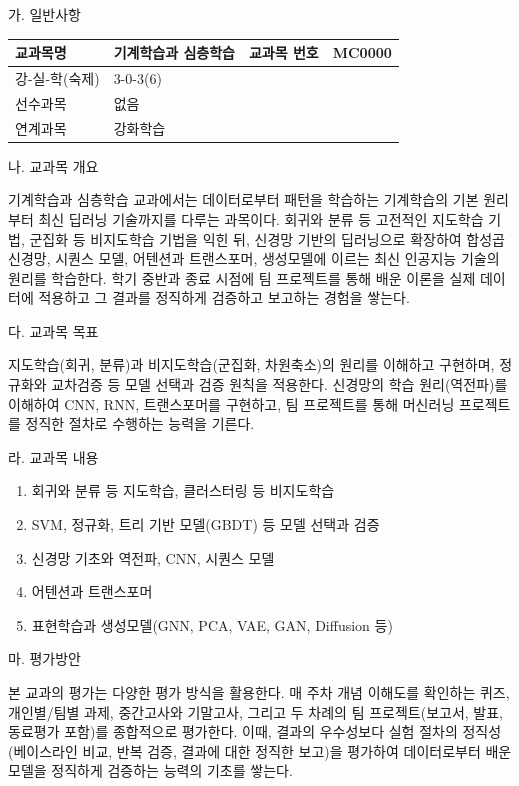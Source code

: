 \documentclass[11pt,a4paper]{article}
\newcommand{\gilban}[5]{%
  \noindent
  \begin{tabular}{|p{2.3cm}|p{4.3cm}|p{2.3cm}|p{4.3cm}|}
    \hline
    \centering 교과목명 & \centering\arraybackslash #1 & \centering 교과목 번호 & \centering\arraybackslash #2 \\
    \hline
    \centering 강-실-학(숙제) & \multicolumn{3}{l|}{\hspace{2mm}#3} \\
    \hline
    \centering 선수과목 & \multicolumn{3}{l|}{\hspace{2mm}#4} \\
    \hline
    \centering 연계과목 & \multicolumn{3}{l|}{\hspace{2mm}#5} \\
    \hline
  \end{tabular}
}
\newcounter{gwamok}
\newcommand{\gwamoktitle}[3]{%
  \stepcounter{gwamok}
  \vspace{6mm}
  \noindent{\bf \thegwamok. #1 (#2, #3)}\par
  \vspace{1mm}
  \noindent\hspace*{3mm}가. 일반사항\par
  \vspace{1mm}
}
\begin{document}
\gwamoktitle{기계학습과 심층학습}{선택}{3학점}
\gilban{기계학습과 심층학습}{MC0000}{3-0-3(6)}{없음}{강화학습}

\vspace{3mm}
\hspace*{3mm}나. 교과목 개요\\[1mm]
\hspace*{5mm}\begin{minipage}{0.92\textwidth}
기계학습과 심층학습 교과에서는 데이터로부터 패턴을 학습하는 기계학습의 기본 원리부터 최신
딥러닝 기술까지를 다루는 과목이다. 회귀와 분류 등 고전적인 지도학습
기법, 군집화 등 비지도학습 기법을 익힌 뒤, 신경망 기반의 딥러닝으로
확장하여 합성곱 신경망, 시퀀스 모델, 어텐션과 트랜스포머, 생성모델에
이르는 최신 인공지능 기술의 원리를 학습한다. 학기 중반과 종료 시점에
팀 프로젝트를 통해 배운 이론을 실제 데이터에 적용하고 그 결과를
정직하게 검증하고 보고하는 경험을 쌓는다.
\end{minipage}

\vspace{3mm}
\hspace*{3mm}다. 교과목 목표\\[1mm]
\hspace*{5mm}\begin{minipage}{0.92\textwidth}
지도학습(회귀, 분류)과 비지도학습(군집화, 차원축소)의 원리를 이해하고
구현하며, 정규화와 교차검증 등 모델 선택과 검증 원칙을 적용한다.
신경망의 학습 원리(역전파)를 이해하여 CNN, RNN, 트랜스포머를 구현하고,
팀 프로젝트를 통해 머신러닝 프로젝트를 정직한 절차로 수행하는 능력을
기른다.
\end{minipage}

\vspace{3mm}
\hspace*{3mm}라. 교과목 내용
\begin{enumerate}[leftmargin=13mm,itemsep=0mm,label=\arabic*)]
\item 회귀와 분류 등 지도학습, 클러스터링 등 비지도학습
\item SVM, 정규화, 트리 기반 모델(GBDT) 등 모델 선택과 검증
\item 신경망 기초와 역전파, CNN, 시퀀스 모델
\item 어텐션과 트랜스포머
\item 표현학습과 생성모델(GNN, PCA, VAE, GAN, Diffusion 등)
\end{enumerate}

\vspace{3mm}
\hspace*{3mm}마. 평가방안\\[1mm]
\hspace*{5mm}\begin{minipage}{0.92\textwidth}
본 교과의 평가는 다양한 평가 방식을 활용한다. 매 주차 개념 이해도를
확인하는 퀴즈, 개인별/팀별 과제, 중간고사와 기말고사, 그리고 두 차례의
팀 프로젝트(보고서, 발표, 동료평가 포함)를 종합적으로 평가한다. 이때,
결과의 우수성보다 실험 절차의 정직성(베이스라인 비교, 반복 검증,
결과에 대한 정직한 보고)을 평가하여 데이터로부터 배운 모델을 정직하게
검증하는 능력의 기초를 쌓는다.

\end{minipage}
\end{document}
